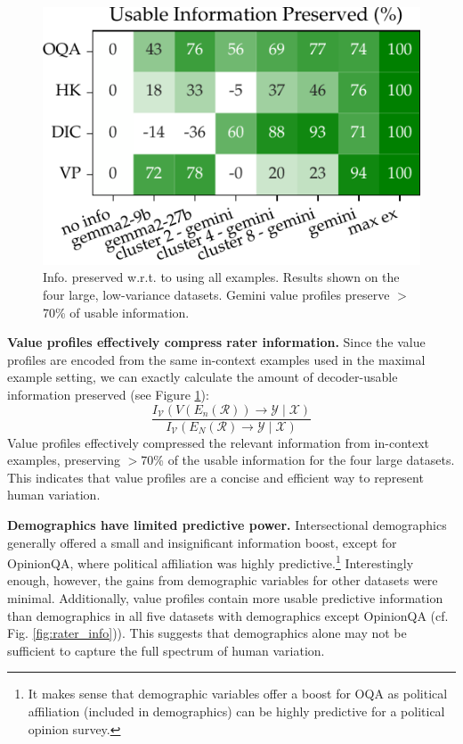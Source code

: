 \documentclass[11pt]{article}
\begin{document}
\begin{figure}
\centering
\includegraphics[width=0.7\columnwidth]{files/info_preserved_small.pdf}
\caption{
Info. preserved w.r.t. to using all examples. Results shown on the four large, low-variance datasets.
Gemini value profiles preserve $>$70\% of usable information.
}
\label{fig:info_preserved}
\vspace{-15pt}
\end{figure}


\textbf{Value profiles effectively compress rater information.}
Since the value profiles are encoded from the same in-context examples used in the maximal example setting, we can exactly calculate the amount of decoder-usable information preserved (see Figure \ref{fig:info_preserved}):
\begin{equation}
\label{eq:info_preserved}
\frac{I_\mathcal{V}(V(E_n(\mathcal{R})) \to \mathcal{Y} \mid \mathcal{X})}{I_\mathcal{V}(E_N(\mathcal{R}) \to \mathcal{Y} \mid \mathcal{X})}
\end{equation}
Value profiles effectively compressed the relevant information from in-context examples, preserving $>$70\% of the usable information for the four large datasets. This indicates that value profiles are a concise and efficient way to represent human variation.

\textbf{Demographics have limited predictive power.}
Intersectional demographics generally offered a small and insignificant information boost, except for OpinionQA, where political affiliation was highly predictive.\footnote{It makes sense that demographic variables offer a boost for OQA as political affiliation (included in demographics) can be highly predictive for a political opinion survey.} Interestingly enough, however, the gains from demographic variables for other datasets were minimal. Additionally, value profiles contain more usable predictive information than demographics in all five datasets with demographics except OpinionQA (cf. Fig. \ref{fig:rater_info})). This suggests that demographics alone may not be sufficient to capture the full spectrum of human variation.
\end{document}
